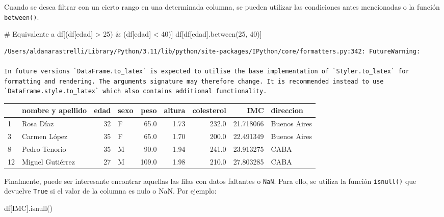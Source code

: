 \documentclass[
  letterpaper,
  DIV=11,
  numbers=noendperiod]{scrreprt}
\newenvironment{Shaded}{\begin{snugshade}}{\end{snugshade}}
\newcommand{\CommentTok}[1]{\textcolor[rgb]{0.37,0.37,0.37}{#1}}
\newcommand{\DecValTok}[1]{\textcolor[rgb]{0.68,0.00,0.00}{#1}}
\newcommand{\NormalTok}[1]{\textcolor[rgb]{0.00,0.23,0.31}{#1}}
\newcommand{\StringTok}[1]{\textcolor[rgb]{0.13,0.47,0.30}{#1}}
\begin{document}
Cuando se desea filtrar con un cierto rango en una determinada columna,
se pueden utilizar las condiciones antes mencionadas o la función
\texttt{between()}.

\begin{Shaded}
\begin{Highlighting}[]
\CommentTok{\# Equivalente a df[(df[\textquotesingle{}edad\textquotesingle{}] \textgreater{} 25) \& (df[\textquotesingle{}edad\textquotesingle{}] \textless{} 40)]}
\NormalTok{df[df[}\StringTok{\textquotesingle{}edad\textquotesingle{}}\NormalTok{].between(}\DecValTok{25}\NormalTok{, }\DecValTok{40}\NormalTok{)]}
\end{Highlighting}
\end{Shaded}

\begin{verbatim}
/Users/aldanarastrelli/Library/Python/3.11/lib/python/site-packages/IPython/core/formatters.py:342: FutureWarning:

In future versions `DataFrame.to_latex` is expected to utilise the base implementation of `Styler.to_latex` for formatting and rendering. The arguments signature may therefore change. It is recommended instead to use `DataFrame.style.to_latex` which also contains additional functionality.
\end{verbatim}

\begin{tabular}{llrlrrrrl}
\toprule
{} & nombre y apellido &  edad & sexo &   peso &  altura &  colesterol &        IMC &     direccion \\
\midrule
1  &         Rosa Díaz &    32 &    F &   65.0 &    1.73 &       232.0 &  21.718066 &  Buenos Aires \\
3  &      Carmen López &    35 &    F &   65.0 &    1.70 &       200.0 &  22.491349 &  Buenos Aires \\
8  &     Pedro Tenorio &    35 &    M &   90.0 &    1.94 &       241.0 &  23.913275 &          CABA \\
12 &  Miguel Gutiérrez &    27 &    M &  109.0 &    1.98 &       210.0 &  27.803285 &          CABA \\
\bottomrule
\end{tabular}

Finalmente, puede ser interesante encontrar aquellas las filas con datos
faltantes o \texttt{NaN}. Para ello, se utiliza la función
\texttt{isnull()} que devuelve \texttt{True} si el valor de la columna
es nulo o NaN. Por ejemplo:

\begin{Shaded}
\begin{Highlighting}[]
\NormalTok{df[}\StringTok{\textquotesingle{}IMC\textquotesingle{}}\NormalTok{].isnull()}
\end{Highlighting}
\end{Shaded}
\end{document}
